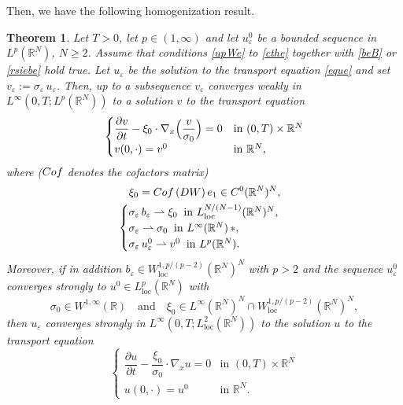 \documentclass[11pt]{article}
\newcommand{\loc}{\mathrm{loc}}
\newcommand{\spfrac}[2]{{#1}/{(#2)}}
\def \RR {\mathbb R}
\theoremstyle{plain}
\newtheorem{Thm}{Theorem}[section]
\theoremstyle{definition}
\numberwithin{equation}{section}
\begin{document}
Then, we have the following homogenization result.
\begin{Thm}\label{thm.hom}
Let $T>0$, let $p\in(1,\infty)$ and let $u_\varepsilon^0$ be a bounded sequence in $L^p(\RR^N)$, $N\geq 2$. Assume that conditions \eqref{upWe} to \eqref{cthe} together with \eqref{beB} or \eqref{rsiebe} hold true.
Let $u_\varepsilon$ be the solution to the transport equation \eqref{eque} and set $v_\varepsilon:=\sigma_\varepsilon\,u_\varepsilon$.
Then, up to a subsequence $v_\varepsilon$ converges weakly in $L^\infty(0,T;L^p(\RR^N))$ to a solution $v$ to the transport equation
\begin{equation}\label{eqv}
\begin{cases}
\dfrac{\partial v}{\partial t}-\xi_0\cdot\nabla_x\Bigl(\dfrac{v}{\sigma_0}\Bigr)=0 & \mbox{in }(0,T)\times\RR^N
\\
v(0,\cdot)=v^0 & \mbox{in }\RR^N,
\end{cases}
\end{equation}
where (${\rm Cof}$ denotes the cofactors matrix)
\begin{gather}\label{xi0cofDW}
\xi_0={\rm Cof}\,(DW)\,e_1\in C^0(\RR^N)^N,
\\
\label{xisiv0}
\begin{cases}
\sigma_\varepsilon\,b_\varepsilon\rightharpoonup \xi_0\;\;\mbox{in }L^{\spfrac{N}{N-1}}_\loc(\RR^N)^N,\\
\sigma_\varepsilon\rightharpoonup\sigma_0\;\;\mbox{in }L^\infty(\RR^N)\,\ast,\\
\sigma_\varepsilon\,u_\varepsilon^0\rightharpoonup v^0\;\;\mbox{in }L^p(\RR^N).
\end{cases}
\end{gather}
Moreover, if in addition $b_\varepsilon\in W^{1,p/(p-2)}_\loc(\RR^N)^N$ with $p>2$ and the sequence $u_\varepsilon^0$ converges strongly to $u^0\in L^p_\loc(\RR^N)$ with
\[
\sigma_0\in W^{1,\infty}(\RR)\quad\text{and}\quad\xi_0\in L^\infty(\RR^N)^N\cap W^{1,p/(p-2)}_\loc(\RR^N)^N,
\]
then $u_\varepsilon$ converges strongly in $L^\infty(0,T;L^2_\loc(\RR^N))$ to the solution $u$ to the transport equation
\begin{equation}\label{equ}
\begin{cases}
\dfrac{\partial u}{\partial t}-\dfrac{\xi_0}{\sigma_0}\cdot\nabla_x u=0 & \mbox{in }(0,T)\times\RR^N
\\[5pt]
u(0,\cdot)=u^0 & \mbox{in }\RR^N.
\end{cases}
\end{equation}
\end{Thm}
\end{document}
